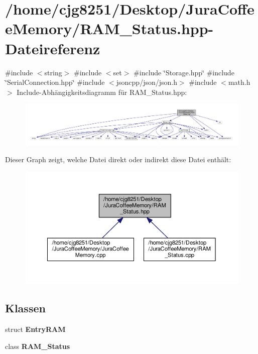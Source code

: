 \section{/home/cjg8251/\+Desktop/\+Jura\+Coffee\+Memory/\+R\+A\+M\+\_\+\+Status.hpp-\/\+Dateireferenz}
\label{_r_a_m___status_8hpp}
{\ttfamily \#include $<$string$>$}\newline
{\ttfamily \#include $<$set$>$}\newline
{\ttfamily \#include \char`\"{}Storage.\+hpp\char`\"{}}\newline
{\ttfamily \#include \char`\"{}Serial\+Connection.\+hpp\char`\"{}}\newline
{\ttfamily \#include $<$jsoncpp/json/json.\+h$>$}\newline
{\ttfamily \#include $<$math.\+h$>$}\newline
Include-\/\+Abhängigkeitsdiagramm für R\+A\+M\+\_\+\+Status.\+hpp\+:
\nopagebreak
\begin{figure}[H]
\begin{center}
\leavevmode
\includegraphics[width=350pt]{_r_a_m___status_8hpp__incl}
\end{center}
\end{figure}
Dieser Graph zeigt, welche Datei direkt oder indirekt diese Datei enthält\+:
\nopagebreak
\begin{figure}[H]
\begin{center}
\leavevmode
\includegraphics[width=350pt]{_r_a_m___status_8hpp__dep__incl}
\end{center}
\end{figure}
\subsection*{Klassen}
\begin{DoxyCompactItemize}
\item 
struct \textbf{ Entry\+R\+AM}
\item 
class \textbf{ R\+A\+M\+\_\+\+Status}
\end{DoxyCompactItemize}
